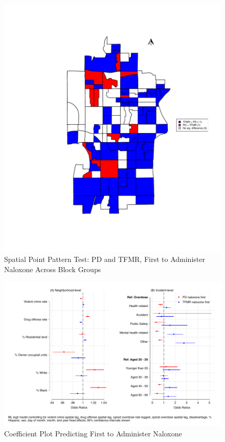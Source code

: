

\begin{figure}
    \caption{Spatial Point Pattern Test: PD and TFMR, First to Administer Naloxone Across Block Groups}
    \centering
    \includegraphics{figures/sppt-naloxone.pdf}
\end{figure}

\newpage



\newpage



\newpage

\begin{figure}
    \caption{Coefficient Plot Predicting First to Administer Naloxone}
    \centering
    \includegraphics{figures/me-logit-coef-comb.pdf}
\end{figure} 


